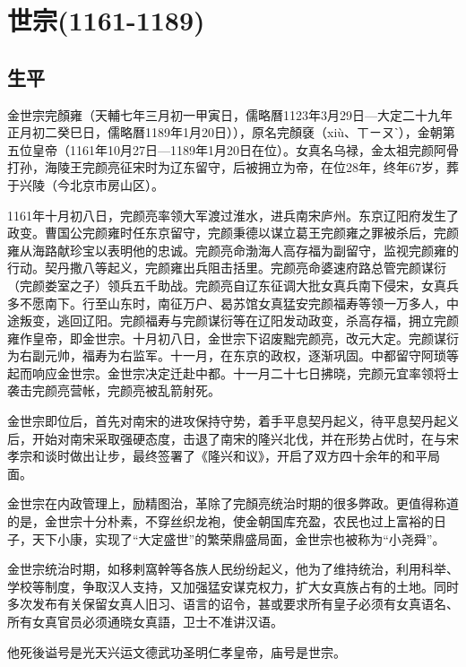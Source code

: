 
\section{世宗\tiny(1161-1189)}

\subsection{生平}

金世宗完顏雍（天輔七年三月初一甲寅日，儒略曆1123年3月29日—大定二十九年正月初二癸巳日，儒略曆1189年1月20日）），原名完顏褎（xiù、ㄒㄧㄡˋ），金朝第五位皇帝（1161年10月27日—1189年1月20日在位）。女真名乌禄，金太祖完颜阿骨打孙，海陵王完颜亮征宋时为辽东留守，后被拥立为帝，在位28年，终年67岁，葬于兴陵（今北京市房山区）。

1161年十月初八日，完颜亮率领大军渡过淮水，进兵南宋庐州。东京辽阳府发生了政变。曹国公完颜雍时任东京留守，完颜秉德以谋立葛王完颜雍之罪被杀后，完颜雍从海路献珍宝以表明他的忠诚。完颜亮命渤海人高存福为副留守，监视完颜雍的行动。契丹撒八等起义，完颜雍出兵阻击括里。完颜亮命婆速府路总管完颜谋衍（完颜娄室之子）领兵五千助战。完颜亮自辽东征调大批女真兵南下侵宋，女真兵多不愿南下。行至山东时，南征万户、曷苏馆女真猛安完颜福寿等领一万多人，中途叛变，逃回辽阳。完颜福寿与完颜谋衍等在辽阳发动政变，杀高存福，拥立完颜雍作皇帝，即金世宗。十月初八日，金世宗下诏废黜完颜亮，改元大定。完颜谋衍为右副元帅，福寿为右监军。十一月，在东京的政权，逐渐巩固。中都留守阿琐等起而响应金世宗。金世宗决定迁赴中都。十一月二十七日拂晓，完颜元宜率领将士袭击完颜亮营帐，完颜亮被乱箭射死。

金世宗即位后，首先对南宋的进攻保持守势，着手平息契丹起义，待平息契丹起义后，开始对南宋采取强硬态度，击退了南宋的隆兴北伐，并在形势占优时，在与宋孝宗和谈时做出让步，最终签署了《隆兴和议》，开启了双方四十余年的和平局面。

金世宗在内政管理上，励精图治，革除了完顏亮统治时期的很多弊政。更值得称道的是，金世宗十分朴素，不穿丝织龙袍，使金朝国库充盈，农民也过上富裕的日子，天下小康，实现了“大定盛世”的繁荣鼎盛局面，金世宗也被称为“小尧舜”。

金世宗统治时期，如移剌窩幹等各族人民纷纷起义，他为了维持统治，利用科举、学校等制度，争取汉人支持，又加强猛安谋克权力，扩大女真族占有的土地。同时多次发布有关保留女真人旧习、语言的诏令，甚或要求所有皇子必须有女真语名、所有女真官员必须通晓女真語，卫士不准讲汉语。

他死後谥号是光天兴运文德武功圣明仁孝皇帝，庙号是世宗。


